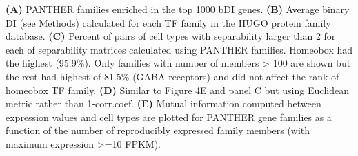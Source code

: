 \textbf{(A)} PANTHER families enriched in the top 1000 bDI genes.
\textbf{(B)} Average binary DI (see Methods) calculated for each TF family in the HUGO protein family database. 
\textbf{(C)} Percent of pairs of cell types with separability larger than 2 for each of separability matrices calculated using PANTHER families. Homeobox had the highest (95.9\%). Only families with number of members > 100 are shown but the rest had highest of 81.5\% (GABA receptors) and did not affect the rank of homeobox TF family.
\textbf{(D)} Similar to Figure 4E and panel C but using Euclidean metric rather than 1-corr.coef. 
\textbf{(E)} Mutual information computed between expression values and cell types are plotted for PANTHER gene families as a function of the number of reproducibly expressed family members (with maximum expression >=10 FPKM). 
